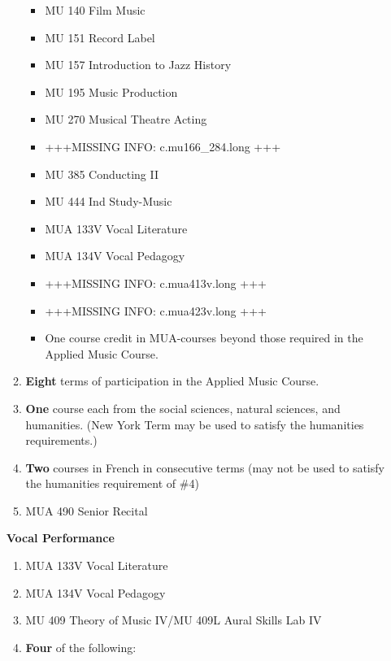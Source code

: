 \documentclass[
  letterpaper,
]{scrbook}
\providecommand{\tightlist}{%
  \setlength{\itemsep}{0pt}\setlength{\parskip}{0pt}}
\begin{document}
\begin{enumerate}
\begin{enumerate}
    \begin{itemize}
    \tightlist
    \item
      MU 140 Film Music
    \item
      MU 151 Record Label
    \item
      MU 157 Introduction to Jazz History
    \item
      MU 195 Music Production
    \item
      MU 270 Musical Theatre Acting
    \item
      +++MISSING INFO: c.mu166\_284.long +++
    \item
      MU 385 Conducting II
    \item
      MU 444 Ind Study-Music
    \item
      MUA 133V Vocal Literature
    \item
      MUA 134V Vocal Pedagogy
    \item
      +++MISSING INFO: c.mua413v.long +++
    \item
      +++MISSING INFO: c.mua423v.long +++
    \item
      One course credit in MUA-courses beyond those required in the
      Applied Music Course.
    \end{itemize}
  \item
    \textbf{Eight} terms of participation in the Applied Music Course.
  \item
    \textbf{One} course each from the social sciences, natural sciences,
    and humanities. (New York Term may be used to satisfy the humanities
    requirements.)
  \item
    \textbf{Two} courses in French in consecutive terms (may not be used
    to satisfy the humanities requirement of \#4)
  \item
    MUA 490 Senior Recital
  \end{enumerate}

  \textbf{Vocal Performance}

  \begin{enumerate}
  \def\labelenumii{\arabic{enumii}.}
  \tightlist
  \item
    MUA 133V Vocal Literature
  \item
    MUA 134V Vocal Pedagogy
  \item
    MU 409 Theory of Music IV/MU 409L Aural Skills Lab IV
  \item
    \textbf{Four} of the following:


\end{enumerate}
\end{enumerate}
\end{document}
